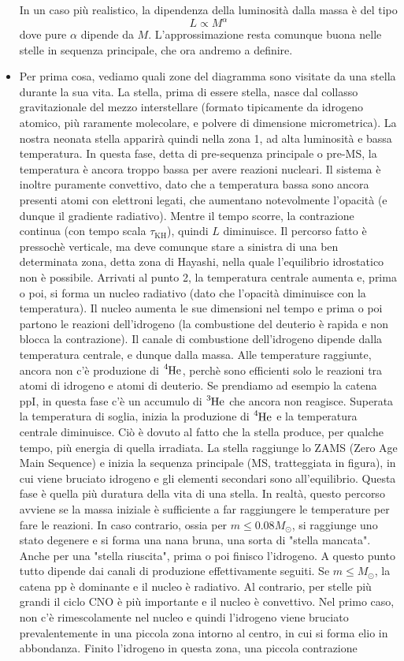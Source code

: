 \documentclass[a4paper,11pt]{article}
\newcommand{\s}{_\odot}
\theoremstyle{theorem}
\theoremstyle{definition}
\begin{document}
\begin{itemize}
		\noindent In un caso più realistico, la dipendenza della luminosità dalla massa è del tipo
		\[L\propto M^\alpha\]
		dove pure $\alpha$ dipende da $M$. L'approssimazione resta comunque buona nelle stelle in sequenza principale, che ora andremo a definire. 
		\item Per prima cosa, vediamo quali zone del diagramma sono visitate da una stella durante la sua vita. La stella, prima di essere stella, nasce dal collasso gravitazionale del mezzo interstellare (formato tipicamente da idrogeno atomico, più raramente molecolare, e polvere di dimensione micrometrica). La nostra neonata stella apparirà quindi nella zona 1, ad alta luminosità e bassa temperatura. In questa fase, detta di pre-sequenza principale o pre-MS, la temperatura è ancora troppo bassa per avere reazioni nucleari. Il sistema è inoltre puramente convettivo, dato che a temperatura bassa sono ancora presenti atomi con elettroni legati, che aumentano notevolmente l'opacità (e dunque il gradiente radiativo). Mentre il tempo scorre, la contrazione continua (con tempo scala $\tau_{\textrm{KH}}$), quindi $L$ diminuisce. Il percorso fatto è pressochè verticale, ma deve comunque stare a sinistra di una ben determinata zona, detta zona di Hayashi, nella quale l'equilibrio idrostatico non è possibile. Arrivati al punto 2, la temperatura centrale aumenta e, prima o poi, si forma un nucleo radiativo (dato che l'opacità diminuisce con la temperatura). Il nucleo aumenta le sue dimensioni nel tempo e prima o poi partono le reazioni dell'idrogeno (la combustione del deuterio è rapida e non blocca la contrazione). Il canale di combustione dell'idrogeno dipende dalla temperatura centrale, e dunque dalla massa. Alle temperature raggiunte, ancora non c'è produzione di $\tensor[^{4}]{\mathrm{He}}{}$, perchè sono efficienti solo le reazioni tra atomi di idrogeno e atomi di deuterio. Se prendiamo ad esempio la catena ppI, in questa fase c'è un accumulo di $\tensor[^{3}]{\mathrm{He}}{}$ che ancora non reagisce. Superata la temperatura di soglia, inizia la produzione di $\tensor[^{4}]{\mathrm{He}}{}$ e la temperatura centrale diminuisce. Ciò è dovuto al fatto che la stella produce, per qualche tempo, più energia di quella irradiata. La stella raggiunge lo ZAMS (Zero Age Main Sequence) e inizia la sequenza principale (MS, tratteggiata in figura), in cui viene bruciato idrogeno e gli elementi secondari sono all'equilibrio. Questa fase è quella più duratura della vita di una stella. In realtà, questo percorso avviene se la massa iniziale è sufficiente a far raggiungere le temperature per fare le reazioni. In caso contrario, ossia per $m\leq 0.08M\s$, si raggiunge uno stato degenere e si forma una nana bruna, una sorta di "stella mancata". Anche per una "stella riuscita", prima o poi finisco l'idrogeno. A questo punto tutto dipende dai canali di produzione effettivamente seguiti. Se $m\leq M\s$, la catena pp è dominante e il nucleo è radiativo. Al contrario, per stelle più grandi il ciclo CNO è più importante e il nucleo è convettivo. Nel primo caso, non c'è rimescolamente nel nucleo e quindi l'idrogeno viene bruciato prevalentemente in una piccola zona intorno al centro, in cui si forma elio in abbondanza. Finito l'idrogeno in questa zona, una piccola contrazione 
\end{itemize}
\end{document}
